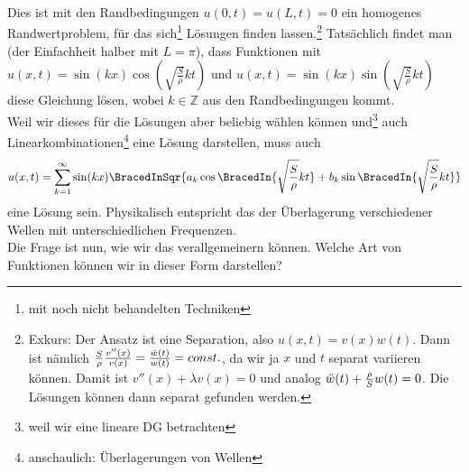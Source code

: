 {Dies ist mit den Randbedingungen $u(0,t)=u(L,t)=0$ ein homogenes Randwertproblem, für das sich\footnote{mit noch nicht behandelten Techniken} Lösungen finden lassen.\footnote{Exkurs: Der Ansatz ist eine Separation, also $u(x,t)=v(x)w(t)$. Dann ist nämlich $\frac{S}{\rho}\frac{v''(x)}{v(x)}=\frac{\Ddot{w}(t)}{w(t)}=const.$, da wir ja $x$ und $t$ separat variieren können. Damit ist $v''(x)+\lambda v(x)=0$ und analog $\Ddot{w}(t)+\frac{\rho}{S}w(t)=0$. Die Lösungen können dann separat gefunden werden.}
Tatsächlich findet man (der Einfachheit halber mit $L=\pi$), dass Funktionen mit $u(x,t)=\sin(kx)\cos(\sqrt{\frac{S}{\rho}}kt)$ und $u(x,t)=\sin(kx)\sin(\sqrt{\frac{S}{\rho}}kt)$ diese Gleichung lösen, wobei $k\in \mathbb{Z}$ aus den Randbedingungen kommt.\\
Weil wir dieses für die Lösungen aber beliebig wählen können und\footnote{weil wir eine lineare DG betrachten} auch Linearkombinationen\footnote{anschaulich: Überlagerungen von Wellen} eine Lösung darstellen, muss auch
\begin{equation*}
    u(x,t)=\sum_{k=1}^\infty \sin(kx)\BracedInSqr{a_k\cos\BracedIn{\sqrt{\frac{S}{\rho}}kt}+b_k\sin\BracedIn{\sqrt{\frac{S}{\rho}}kt}}
\end{equation*}
eine Lösung sein. Physikalisch entspricht das der Überlagerung verschiedener Wellen mit unterschiedlichen Frequenzen.}\\
Die Frage ist nun, wie wir das verallgemeinern können. Welche Art von Funktionen können wir in dieser Form darstellen?

